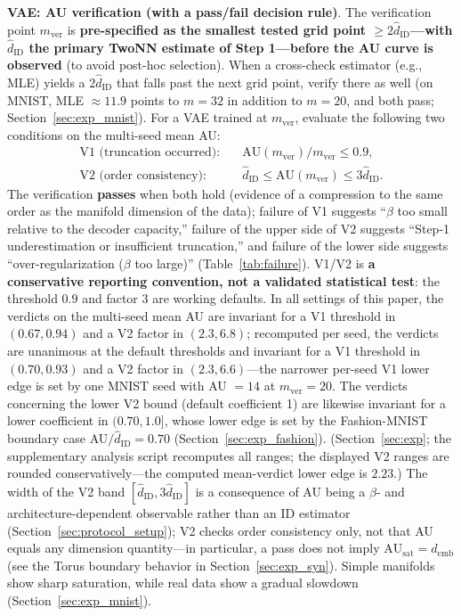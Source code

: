 \documentclass[make,article,submit,pdftex,moreauthors]{Definitions/mdpi}
\newcommand{\hatdID}{\hat{d}_{\mathrm{ID}}}
\newcommand{\AUsat}{\mathrm{AU}_{\mathrm{sat}}}
\newcommand{\demb}{d_{\mathrm{emb}}}
\begin{document}
\textbf{VAE: AU verification (with a pass/fail decision rule)}.
The verification point $m_{\mathrm{ver}}$ is \textbf{pre-specified as the
smallest tested grid point $\geq 2\hatdID$---with $\hatdID$ the primary
TwoNN estimate of Step 1---before the AU curve is observed} (to avoid
post-hoc selection).
When a cross-check estimator (e.g., MLE) yields a $2\hatdID$ that falls
past the next grid point, verify there as well (on MNIST, MLE
$\approx 11.9$ points to $m = 32$ in addition to $m = 20$, and both pass;
Section~\ref{sec:exp_mnist}).
For a VAE trained at $m_{\mathrm{ver}}$, evaluate the following two
conditions on the multi-seed mean AU:
\begin{align}
  \text{V1 (truncation occurred)}:&\quad
  \mathrm{AU}(m_{\mathrm{ver}}) / m_{\mathrm{ver}} \leq 0.9,
  \label{eq:rule_v1}\\
  \text{V2 (order consistency)}:&\quad
  \hatdID \leq \mathrm{AU}(m_{\mathrm{ver}}) \leq 3\hatdID.
  \label{eq:rule_v2}
\end{align}
The verification \textbf{passes} when both hold (evidence of a compression
to the same order as the manifold dimension of the data);
failure of V1 suggests ``$\beta$ too small relative to the decoder
capacity,'' failure of the upper side of V2 suggests ``Step-1
underestimation or insufficient truncation,'' and failure of the lower side
suggests ``over-regularization ($\beta$ too large)''
(Table~\ref{tab:failure}).
V1/V2 is \textbf{a conservative reporting convention, not a validated
statistical test}: the threshold $0.9$ and factor $3$ are working defaults.
In all settings of this paper, the verdicts on the multi-seed mean AU are
invariant for a V1 threshold in $(0.67, 0.94)$ and a V2 factor in
$(2.3, 6.8)$; recomputed per seed, the verdicts are unanimous at the
default thresholds and invariant for a V1 threshold in $(0.70, 0.93)$ and
a V2 factor in $(2.3, 6.6)$---the narrower per-seed V1 lower edge is set by
one MNIST seed with AU $= 14$ at $m_{\mathrm{ver}} = 20$.
The verdicts concerning the lower V2 bound (default coefficient 1) are
likewise invariant for a lower coefficient in $(0.70, 1.0]$, whose lower
edge is set by the Fashion-MNIST boundary case AU$/\hatdID = 0.70$
(Section~\ref{sec:exp_fashion}).
(Section~\ref{sec:exp}; the supplementary analysis script recomputes all
ranges; the displayed V2 ranges are rounded conservatively---the computed
mean-verdict lower edge is $2.23$.)
The width of the V2 band $[\hatdID, 3\hatdID]$ is a consequence of AU being
a $\beta$- and architecture-dependent observable rather than an ID
estimator (Section~\ref{sec:protocol_setup}); V2 checks order consistency
only, not that AU equals any dimension quantity---in particular, a pass
does not imply $\AUsat = \demb$ (see the Torus boundary behavior in
Section~\ref{sec:exp_syn}).
Simple manifolds show sharp saturation, while real data show a gradual
slowdown (Section~\ref{sec:exp_mnist}).
\end{document}
